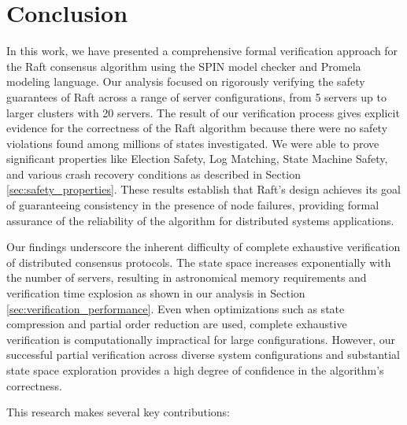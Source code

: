     
    \chapter{Conclusion}
    \label{sec:conclusion}

    In this work, we have presented a comprehensive formal verification approach for the Raft consensus algorithm using the SPIN model checker and Promela modeling language. Our analysis focused on rigorously verifying the safety guarantees of Raft across a range of server configurations, from 5 servers up to larger clusters with 20 servers.
The result of our verification process gives explicit evidence for the correctness of the Raft algorithm because there were no safety violations found among millions of states investigated. We were able to prove significant properties like Election Safety, Log Matching, State Machine Safety, and various crash recovery conditions as described in Section \ref{sec:safety_properties}. These results establish that Raft's design achieves its goal of guaranteeing consistency in the presence of node failures, providing formal assurance of the reliability of the algorithm for distributed systems applications.

Our findings underscore the inherent difficulty of complete exhaustive verification of distributed consensus protocols. The state space increases exponentially with the number of servers, resulting in astronomical memory requirements and verification time explosion as shown in our analysis in Section \ref{sec:verification_performance}. Even when optimizations such as state compression and partial order reduction are used, complete exhaustive verification is computationally impractical for large configurations. However, our successful partial verification across diverse system configurations and substantial state space exploration provides a high degree of confidence in the algorithm's correctness.
    
    This research makes several key contributions:
    
